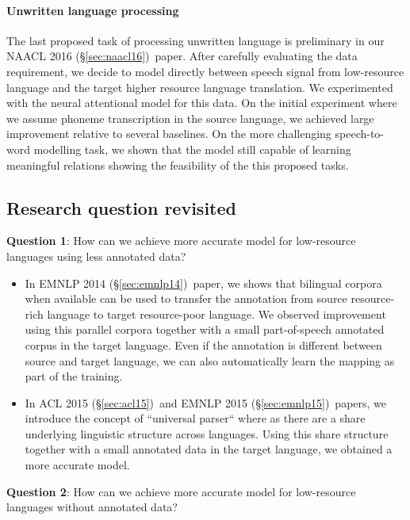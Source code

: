\documentclass[12pt,twoside,final,hidelinks]{ltthesis}
\theoremstyle{definition}
\newcommand\emnlpiv{EMNLP 2014 (\S\ref{sec:emnlp14})}
\newcommand\aclv{ACL 2015 (\S\ref{sec:acl15})}
\newcommand\emnlpv{EMNLP 2015 (\S\ref{sec:emnlp15})}
\newcommand\naaclvi{NAACL 2016 (\S\ref{sec:naacl16})}
\begin{document}
\paragraph{Unwritten language processing}The last proposed task of processing unwritten language is preliminary in our \naaclvi\ paper. After carefully evaluating the data requirement, we decide 
to model directly between speech signal from low-resource language and the target higher resource language translation. We experimented with the neural attentional model 
for this data. On the initial experiment where we assume phoneme transcription in the source language, we achieved large improvement relative to several 
baselines. On the more challenging speech-to-word modelling task, we shown that the model still capable of learning meaningful relations showing the feasibility 
of the this proposed tasks. 

\subsection{Research question revisited}
\textbf{Question 1}: How can we achieve more accurate model for low-resource languages using less annotated data? 
\begin{itemize}
\item In \emnlpiv\ paper, we shows that bilingual corpora when available can be used to transfer the annotation from source resource-rich language to target 
resource-poor language. We observed improvement using this parallel corpora together with a small part-of-speech annotated corpus in the target language. Even if 
the annotation is different between source and target language, we can also automatically learn the mapping as part of the training. 
\item 	In \aclv\ and \emnlpv\ papers, we introduce the concept of ``universal parser`` where as there are a share underlying linguistic structure across languages. 
Using this share structure together with a small annotated data in the target language, we obtained a more accurate model.  
\end{itemize}

\textbf{Question 2}: How can we achieve more accurate model for low-resource languages without annotated data?
\end{document}
